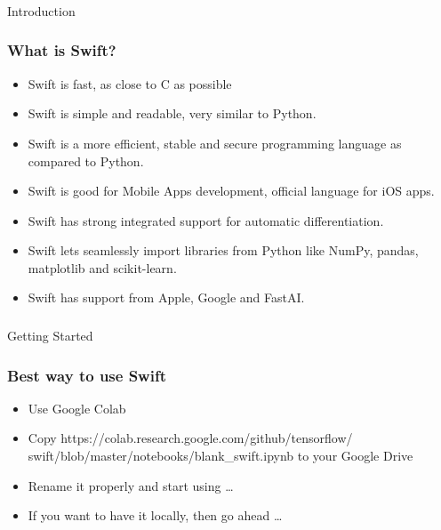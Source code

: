 \begin{frame}[fragile]\frametitle{}
\begin{center}
{\Large Introduction}
\end{center}
\end{frame}



\begin{frame} \frametitle{What is Swift?}
\begin{itemize}
\item Swift is fast, as close to C as possible
\item Swift is simple and readable, very similar to Python. 
\item Swift is a more efficient, stable and secure programming language as compared to Python.
\item Swift is good for Mobile Apps development, official language for iOS apps.
\item Swift has strong integrated support for automatic differentiation.
\item Swift lets seamlessly import libraries from Python like NumPy, pandas, matplotlib and scikit-learn. 
\item Swift has support from Apple, Google and FastAI.
\end{itemize}
\end{frame}


\begin{frame}[fragile]\frametitle{}
\begin{center}
{\Large Getting Started}
\end{center}
\end{frame}

\begin{frame} \frametitle{Best way to use Swift}

\begin{itemize}
\item Use Google Colab
\item Copy https://colab.research.google.com/github/tensorflow/ swift/blob/master/notebooks/blank\_swift.ipynb to your Google Drive
\item Rename it properly and start using \ldots
\item If you want to have it locally, then go ahead \ldots
\end{itemize}

\end{frame}


